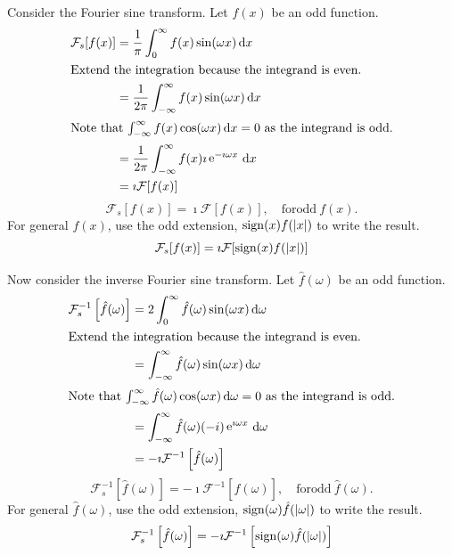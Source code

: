 {%
\begin{Solution}
  \label{solution ode ft fst ft}
  Consider the Fourier sine transform.  Let $f(x)$ be an odd function.
  \begin{align*}
    \mathcal{F}_s[f(x)]
    &= \frac{1}{\pi} \int_0^\infty f(x) \sin(\omega x) \,\mathrm{d} x \\
    \intertext{Extend the integration because the integrand is even.}
    &= \frac{1}{2 \pi} \int_{-\infty}^\infty f(x) \sin(\omega x) \,\mathrm{d} x \\
    \intertext{Note that $\int_{-\infty}^\infty f(x) \cos(\omega x)\,\mathrm{d} x = 0$ as the integrand
      is odd.}
    &= \frac{1}{2 \pi} \int_{-\infty}^\infty f(x) \imath \mathop{\mathrm{e}}\nolimits^{-\imath \omega x} \,\mathrm{d} x \\
    &= \imath \mathcal{F}[f(x)]
  \end{align*}
  \[
  \mathcal{F}_s[f(x)] = \imath \mathcal{F}[f(x)], \quad \mathrm{for odd}\ f(x).
  \]
  For general $f(x)$, use the odd extension, $\mathop{\mathrm{sign}}\nolimits(x) f(|x|)$ to write 
  the result.
  \[
  \mathcal{F}_s[f(x)] = \imath \mathcal{F}[\mathop{\mathrm{sign}}\nolimits(x) f(|x|)]
  \]

  Now consider the inverse Fourier sine transform.  Let $\hat{f}(\omega)$ 
  be an odd function.
  \begin{align*}
    \mathcal{F}_s^{-1} \left[ \hat{f}(\omega) \right]
    &= 2 \int_0^\infty \hat{f}(\omega) \sin(\omega x) \,\mathrm{d} \omega \\
    \intertext{Extend the integration because the integrand is even.}
    &= \int_{-\infty}^\infty \hat{f}(\omega) \sin(\omega x) \,\mathrm{d} \omega \\
    \intertext{Note that $\int_{-\infty}^\infty \hat{f}(\omega) \cos(\omega x)\,\mathrm{d} \omega = 0$ 
      as the integrand is odd.}
    &= \int_{-\infty}^\infty \hat{f}(\omega) (-i) \mathop{\mathrm{e}}\nolimits^{\imath \omega x} \,\mathrm{d} \omega \\
    &= -\imath \mathcal{F}^{-1} \left[ \hat{f}(\omega) \right]
  \end{align*}
  \[
  \mathcal{F}_s^{-1} \left[ \hat{f}(\omega) \right] 
  = - \imath \mathcal{F}^{-1} \left[ \hat{f}(\omega) \right], \quad 
  \mathrm{for odd}\ \hat{f}(\omega).
  \]
  For general $\hat{f}(\omega)$, use the odd extension, 
  $\mathop{\mathrm{sign}}\nolimits(\omega) \hat{f}(|\omega|)$ to write the result.
  \[
  \mathcal{F}_s^{-1} \left[ \hat{f}(\omega) \right] 
  = - \imath \mathcal{F}^{-1} \left[ \mathop{\mathrm{sign}}\nolimits(\omega) \hat{f}(|\omega|) \right]
  \]
\end{Solution}








}

